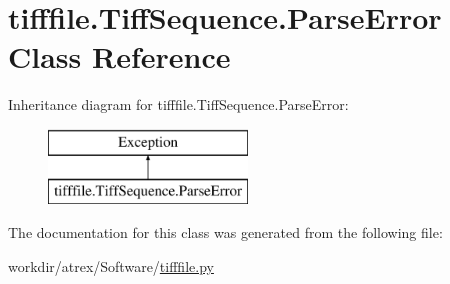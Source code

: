 \hypertarget{classtifffile_1_1_tiff_sequence_1_1_parse_error}{\section{tifffile.\-Tiff\-Sequence.\-Parse\-Error Class Reference}
\label{classtifffile_1_1_tiff_sequence_1_1_parse_error}
}
Inheritance diagram for tifffile.\-Tiff\-Sequence.\-Parse\-Error\-:\begin{figure}[H]
\begin{center}
\leavevmode
\includegraphics[height=2.000000cm]{classtifffile_1_1_tiff_sequence_1_1_parse_error}
\end{center}
\end{figure}


The documentation for this class was generated from the following file\-:\begin{DoxyCompactItemize}
\item 
workdir/atrex/\-Software/\hyperlink{tifffile_8py}{tifffile.\-py}\end{DoxyCompactItemize}
